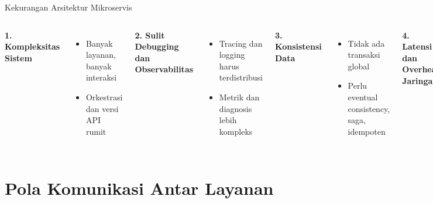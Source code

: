 \documentclass[aspectratio=169, table]{beamer}
\begin{document}
\begin{frame}[fragile]{Kekurangan Arsitektur Mikroservis}
	\vspace{10pt}
	\begin{columns}[T]
		\textbf{1. Kompleksitas Sistem}
		\begin{itemize}
			\item Banyak layanan, banyak interaksi
			\item Orkestrasi dan versi API rumit
		\end{itemize}
		
		\textbf{2. Sulit Debugging dan Observabilitas}
		\begin{itemize}
			\item Tracing dan logging harus terdistribusi
			\item Metrik dan diagnosis lebih kompleks
		\end{itemize}
		
		\textbf{3. Konsistensi Data}
		\begin{itemize}
			\item Tidak ada transaksi global
			\item Perlu eventual consistency, saga, idempoten
		\end{itemize}
		
		\textbf{4. Latensi dan Overhead Jaringan}
		\begin{itemize}
			\item Komunikasi via jaringan → lambat
			\item Perlu retry dan protokol efisien
		\end{itemize}
		
		\textbf{5. Biaya Operasional Tinggi}
		\begin{itemize}
			\item Perlu service mesh, gateway, registry
			\item Butuh tooling dan infrastruktur kompleks
		\end{itemize}
	\end{columns}
\end{frame}

\section{Pola Komunikasi Antar Layanan}
\end{document}
